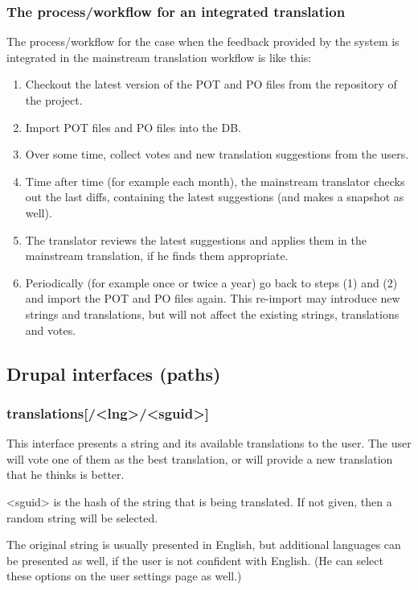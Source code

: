 \documentclass[11pt]{article}
\begin{document}
\subsubsection{The process/workflow for an integrated translation}
\label{sec-8.2.6}


    The process/workflow for the case when the feedback provided by the
    system is integrated in the mainstream translation workflow is like
    this:
\begin{enumerate}
\item Checkout the latest version of the POT and PO files from the
       repository of the project.
\item Import POT files and PO files into the DB.
\item Over some time, collect votes and new translation suggestions
       from the users.
\item Time after time (for example each month), the mainstream
       translator checks out the last diffs, containing the latest
       suggestions (and makes a snapshot as well).
\item The translator reviews the latest suggestions and applies them
       in the mainstream translation, if he finds them appropriate.
\item Periodically (for example once or twice a year) go back to steps
       (1) and (2) and import the POT and PO files again. This
       re-import may introduce new strings and translations, but will
       not affect the existing strings, translations and votes.
\end{enumerate}
\subsection{Drupal interfaces (paths)}
\label{sec-8.3}


\subsubsection{translations[/<lng>/<sguid>]}
\label{sec-8.3.1}


    This interface presents a string and its available translations to
    the user. The user will vote one of them as the best translation,
    or will provide a new translation that he thinks is better.

    <sguid> is the hash of the string that is being translated. If not
    given, then a random string will be selected.

    The original string is usually presented in English, but
    additional languages can be presented as well, if the user is not
    confident with English. (He can select these options on the user
    settings page as well.)
\end{document}
